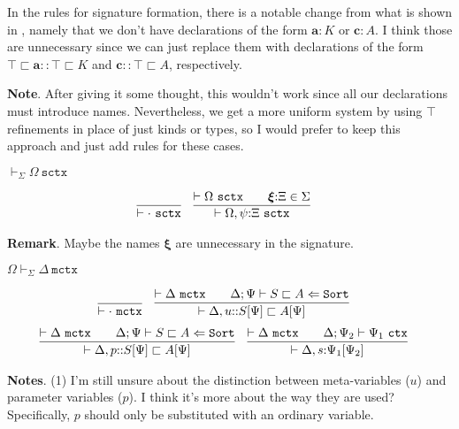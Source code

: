 \documentclass[letterpaper, 11pt]{article}
\newcommand{\Lar}{\Leftarrow}
\newcommand{\Sort}{\texttt{Sort}}
\newcommand{\ctx}{\texttt{ctx}}
\newcommand{\mctx}{\texttt{mctx}}
\newcommand{\sctx}{\texttt{sctx}}
\begin{document}
    In the rules for signature formation, there is a notable change from what is shown in \cite{LovasPfenning2010}, namely that we don't have
    declarations of the form $\textbf{a} {:} K$ or $\textbf{c} : A$.  I think those are unnecessary since we can just replace them with declarations
    of the form $\top \sqsubset \textbf{a} {::} \top \sqsubset K$ and $\textbf{c} {::} \top \sqsubset A$, respectively.

    \textbf{Note}.  After giving it some thought, this wouldn't work since all our declarations must introduce names.  Nevertheless, we get a more
    uniform system by using $\top$ refinements in place of just kinds or types, so I would prefer to keep this approach and just add rules for
    these cases.

    $\boxed{\vdash_\Sigma \Omega \ \sctx}$

    \begin{align*}
      & \infer{\vdash \cdot \ \sctx}{} &
      & \infer{\vdash \Omega, \psi {:} \Xi \ \sctx}
        {
          \vdash \Omega \ \sctx
          &&
          \boldsymbol{\xi} {:} \Xi \in \Sigma
        }
    \end{align*}

    \textbf{Remark}.  Maybe the names $\boldsymbol{\xi}$ are unnecessary in the signature.

    $\boxed{\Omega \vdash_\Sigma \Delta \ \mctx}$

    \begin{align*}
      & \infer{\vdash \cdot \ \mctx}{} &
      & \infer{\vdash \Delta, u{::} S[\Psi] \sqsubset A[\Psi]}
        {
          \vdash \Delta \ \mctx
          &&
          \Delta ; \Psi \vdash S \sqsubset A \Lar \Sort
        }
    \end{align*}
    \begin{align*}
      & \infer{\vdash \Delta, p{::} S[\Psi] \sqsubset A[\Psi]}
        {
          \vdash \Delta \ \mctx
          &&
          \Delta ; \Psi \vdash S \sqsubset A \Lar \Sort
        } &
      & \infer{\vdash \Delta, s{:} \Psi_1[\Psi_2]}
        {
          \vdash \Delta \ \mctx
          &&
          \Delta ; \Psi_2 \vdash \Psi_1 \ \ctx
        }
    \end{align*}

    \textbf{Notes}. (1) I'm still unsure about the distinction between meta-variables ($u$) and parameter variables ($p$).  I think it's more about 
    the way they are used?  Specifically, $p$ should only be substituted with an ordinary variable.
\end{document}
